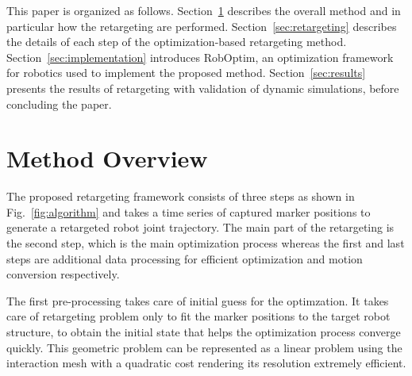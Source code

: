 \documentclass[letterpaper, 10 pt, conference]{ieeeconf}  %
\begin{document}
This paper is organized as follows. Section~\ref{sec:overview}
describes the overall method and in particular how the retargeting
are performed. Section~\ref{sec:retargeting} describes the
details of each step of the optimization-based retargeting method.
Section~\ref{sec:implementation} introduces 
RobOptim, an optimization framework for robotics used to implement the
proposed method. Section~\ref{sec:results} presents the results of
retargeting with validation of dynamic simulations, before concluding
the paper.

\section{Method Overview}
\label{sec:overview}

The proposed retargeting framework consists of three steps as shown in
Fig.~\ref{fig:algorithm} and  
takes a time series of captured marker positions to
generate a retargeted robot joint trajectory.  
The main part of the retargeting is the second step, which is the main
optimization process whereas the first and last steps are additional
data processing for efficient optimization and motion conversion
respectively. 

The first pre-processing takes care of initial guess for the
optimzation. It takes care of retargeting problem only to fit the
marker positions to the target robot structure, to obtain the initial
state that helps the optimization process converge quickly.
This geometric problem can be represented as a
linear problem using the interaction mesh \cite{Komura10}
with a quadratic cost rendering its resolution
extremely efficient.
\end{document}
